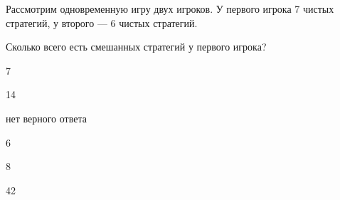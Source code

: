 
\begin{question}
Рассмотрим одновременную игру двух игроков. У первого игрока 7 чистых
стратегий, у второго --- 6 чистых стратегий.

Сколько всего есть смешанных стратегий у первого игрока?
\begin{answerlist}
  \item 7
  \item 14
  \item нет верного ответа
  \item 6
  \item 8
  \item 42
\end{answerlist}
\end{question}


